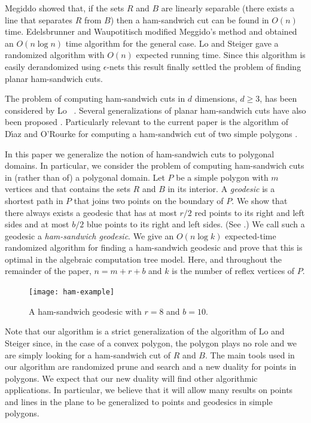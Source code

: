\documentclass[charterfonts,lotsofwhite]{patmorin}
\begin{document}
Megiddo \cite{m85} showed that, if the sets $R$ and $B$ are linearly
separable (there exists a line that separates $R$ from $B$) then a
ham-sandwich cut can be found in $O(n)$ time.  Edelsbrunner and
Waupotitisch \cite{ew86} modified Meggido's method and obtained an
$O(n\log n)$ time algorithm for the general case.  Lo and Steiger
\cite{ls90} gave a randomized algorithm with $O(n)$ expected running
time.  Since this algorithm is easily derandomized using
$\epsilon$-nets \cite{lms94} this result finally settled the problem of
finding planar ham-sandwich cuts. 

The problem of computing ham-sandwich cuts in $d$ dimensions, $d\ge
3$, has been considered by Lo \etal\ \cite{lms94}.  Several
generalizations of planar ham-sandwich cuts have also been proposed
\cite{anru98,bks00,iuy98a,iuy98b}. Particularly relevant to the
current paper is the algorithm of D{\'\i}az and O'Rourke for computing
a ham-sandwich cut of two simple polygons \cite{do90}. 

In this paper we generalize the notion of ham-sandwich cuts to
polygonal domains.  In particular, we consider the problem of
computing ham-sandwich cuts in (rather than of) a polygonal domain.
Let $P$ be a simple polygon with $m$ vertices and that contains the
sets $R$ and $B$ in its interior.  A \emph{geodesic} is a shortest
path in $P$ that joins two points on the boundary of $P$.  We show
that there always exists a geodesic that has at most $r/2$ red points
to its right and left sides and at most $b/2$ blue points to its right
and left sides.  (See .) We call such a geodesic a
\emph{ham-sandwich geodesic}.  We give an $O(n\log k)$ expected-time
randomized algorithm for finding a ham-sandwich geodesic and prove
that this is optimal in the algebraic computation tree model.  Here,
and throughout the remainder of the paper, $n=m+r+b$ and $k$ is the
number of reflex vertices of $P$.

\begin{figure}[htbp]
\begin{center}
\texttt{[image: ham-example]}
\end{center}
\caption{A ham-sandwich geodesic with $r=8$ and $b=10$.}
\end{figure}


Note that our algorithm is a strict generalization of the algorithm of
Lo and Steiger since, in the case of a convex polygon, the polygon
plays no role and we are simply looking for a ham-sandwich cut of $R$
and $B$.  The main tools used in our algorithm are randomized prune
and search \cite{m83} and a new duality for points in polygons.  We
expect that our new duality will find other algorithmic applications.
In particular, we believe that it will allow many results on points
and lines in the plane to be generalized to points and geodesics in
simple polygons.
\end{document}

